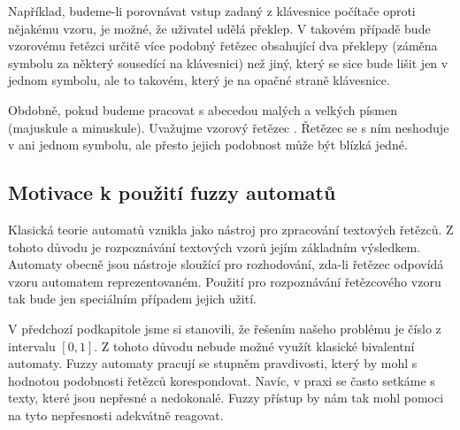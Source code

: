 \documentclass[a4paper,10pt]{article}
\begin{document}
Například, budeme-li porovnávat vstup zadaný z klávesnice počítače oproti nějakému vzoru, je možné, že uživatel udělá překlep. V takovém případě bude vzorovému řetězci určitě více podobný řetězec obsahující dva překlepy (záměna symbolu za některý sousedící na klávesnici) než jiný, který se sice bude lišit jen v jednom symbolu, ale to takovém, který je na opačné straně klávesnice.

Obdobně, pokud budeme pracovat s abecedou malých a velkých písmen (majuskule a minuskule). Uvažujme vzorový řetězec . Řetězec  se s ním neshoduje v ani jednom symbolu, ale přesto jejich podobnost může být blízká jedné.


\subsection{Motivace k použití fuzzy automatů}
Klasická teorie automatů vznikla jako nástroj pro zpracování textových řetězců. Z tohoto důvodu je rozpoznávání textových vzorů jejím základním výsledkem. Automaty obecně jsou nástroje sloužící pro rozhodování, zda-li řetězec odpovídá vzoru automatem reprezentovaném. Použití pro rozpoznávání řetězcového vzoru tak bude jen speciálním případem jejich užití.

V předchozí podkapitole jsme si stanovili, že řešením našeho problému je číslo z intervalu $[0,1]$. Z tohoto důvodu nebude možné využít klasické bivalentní automaty. Fuzzy automaty pracují se stupněm pravdivosti, který by mohl s hodnotou podobnosti řetězců korespondovat. Navíc, v praxi se často setkáme s texty, které jsou nepřesné a nedokonalé. Fuzzy přístup by nám tak mohl pomoci na tyto nepřesnosti adekvátně reagovat.

 
\end{document}
